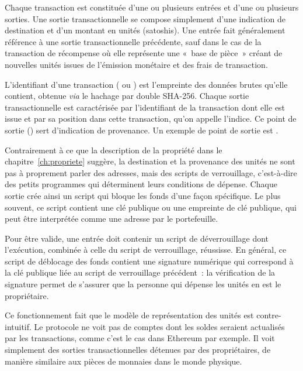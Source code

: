 Chaque transaction est constituée d'une ou plusieurs entrées et d'une ou plusieurs sorties. Une sortie transactionnelle se compose simplement d'une indication de destination et d'un montant en unités (satoshis). Une entrée fait généralement référence à une sortie transactionnelle précédente, sauf dans le cas de la transaction de récompense où elle représente une «~base de pièce~» créant de nouvelles unités issues de l'émission monétaire et des frais de transaction. %

L'identifiant d'une transaction ( ou ) est l'empreinte des données brutes qu'elle contient, obtenue \emph{via} le hachage par double SHA-256. Chaque sortie transactionnelle est caractérisée par l'identifiant de la transaction dont elle est issue et par sa position dans cette transaction, qu'on appelle l'indice. Ce point de sortie () sert d'indication de provenance. Un exemple de point de sortie est .

Contrairement à ce que la description de la propriété dans le chapitre~\ref{ch:propriete} suggère, la destination et la provenance des unités ne sont pas à proprement parler des adresses, mais des scripts de verrouillage, c'est-à-dire des petits programmes qui déterminent leurs conditions de dépense. Chaque sortie crée ainsi un script qui bloque les fonds d'une façon spécifique. Le plus souvent, ce script contient une clé publique ou une empreinte de clé publique, qui peut être interprétée comme une adresse par le portefeuille.

Pour être valide, une entrée doit contenir un script de déverrouillage dont l'exécution, combinée à celle du script de verrouillage, réussisse. En général, ce script de déblocage des fonds contient une signature numérique qui correspond à la clé publique liée au script de verrouillage précédent~: la vérification de la signature permet de s'assurer que la personne qui dépense les unités en est le propriétaire.

Ce fonctionnement fait que le modèle de représentation des unités est contre-intuitif. Le protocole ne voit pas de comptes dont les soldes seraient actualisés par les transactions, comme c'est le cas dans Ethereum par exemple. Il voit simplement des sorties transactionnelles détenues par des propriétaires, de manière similaire aux pièces de monnaies dans le monde physique.

